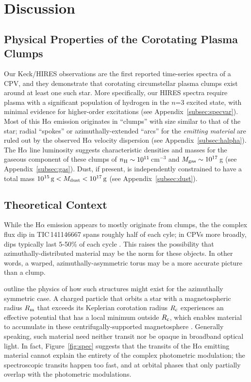 \documentclass[11pt,twocolumn,tighten,linenumbers]{aastex7}
\begin{document}
\section{Discussion}
\label{sec:disc}

\subsection{Physical Properties of the Corotating Plasma Clumps}


Our Keck/HIRES observations are the first reported time-series spectra
of a CPV, and they demonstrate that corotating circumstellar plasma
clumps exist around at least one such star.  More specifically, our
HIRES spectra require plasma with a significant population of hydrogen
in the $n$=3 excited state, with minimal evidence for 
higher-order excitations (see Appendix~\ref{subsec:specvar}).  Most of
this H$\alpha$ emission originates in ``clumps'' with size similar to
that of the star; radial ``spokes'' or azimuthally-extended ``arcs''
for the {\it emitting material} are ruled out by the observed H$\alpha$
velocity dispersion (see Appendix~\ref{subsec:halpha}).  The H$\alpha$
line luminosity suggests characteristic densities and masses for the
gaseous component of these clumps of $n_{\rm H} \sim
10^{11}$\,cm$^{-3}$ and $M_{\rm gas} \sim 10^{17}$\,g (see
Appendix~\ref{subsec:gas}).  Dust, if present, is independently
constrained to have a total mass $10^{15}\,{\rm g} < M_{\rm dust} <
10^{17}\,{\rm g}$ (see Appendix~\ref{subsec:dust}).  


\subsection{Theoretical Context}

While the H$\alpha$ emission appears to mostly originate from clumps,
the the complex flux dip in TIC\,141146667 spans roughly half of each
cyle; in CPVs more broadly, dips typically last 5-50\% of each cycle
\citep{Bouma2024}.  This raises the possibility that
azimuthally-distributed material may be the norm for these objects.
In other words, a warped, azimuthally-asymmetric torus may be a more
accurate picture than a clump.

\citet{Townsend2005} outline the physics of how such structures might
exist for the azimuthally symmetric case.
A charged particle that orbits a 
star with a magnetospheric radius $R_{\rm m}$ that exceeds
its Keplerian corotation radius $R_{\rm c}$ experiences an effective potential
that has a local minimum outside
$R_{\rm c}$, which enables material to accumulate in these
centrifugally-supported magnetosphere
\citep{Petit2013,Daley-Yates2024}.  Generally speaking, such material
need neither transit nor be opaque in broadband optical light.  In
fact, Figure~\ref{fig:spec} suggests that the transits of the
H$\alpha$ emitting material cannot explain the entirety of the complex
photometric modulation;  the spectroscopic transits happen too fast,
and at orbital phases that only partially overlap with the photometric
modulations.
\end{document}
